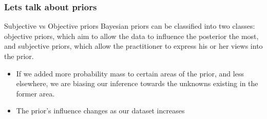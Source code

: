 \documentclass[table,dvipsnames]{beamer}
\newcommand{\keywd}{\textcolor{myorange}}
\begin{document}
\begin{frame}[fragile]
\frametitle{Lets talk about priors}
\footnotesize

\begin{block}{Subjective vs Objective priors}
Bayesian priors can be classified into two classes: \keywd{objective priors}, 
which aim to allow the data to influence the posterior the most, and 
\keywd{subjective priors}, which allow the practitioner to express his or her 
views into the prior.
\end{block}

\begin{itemize}
 \item If we added more probability mass to certain areas of 
the prior, and less elsewhere, we are biasing our inference towards the 
unknowns 
existing in the former area.
\item The prior's influence changes as our dataset increases
\end{itemize}
\end{frame}

\end{document}
